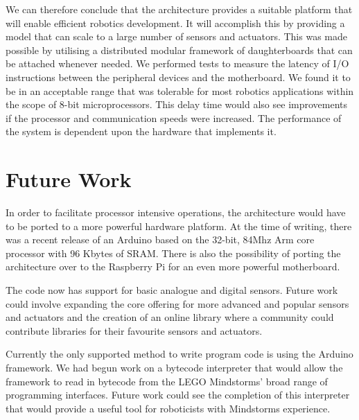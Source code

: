 We can therefore conclude that the \xten architecture provides a suitable platform that will enable efficient robotics development. It will accomplish this by providing a model that can scale to a large number of sensors and actuators. This was made possible by utilising a distributed modular framework of daughterboards that can be attached whenever needed. We performed tests to measure the latency of I/O instructions between the peripheral devices and the motherboard. We found it to be in an acceptable range that was tolerable for most robotics applications within the scope of 8-bit microprocessors. This delay time would also see improvements if the processor and communication speeds were increased. The performance of the system is dependent upon the hardware that implements it.

\section{Future Work}
In order to facilitate processor intensive operations, the architecture would have to be ported to a more powerful hardware platform. At the time of writing, there was a recent release of an Arduino based on the 32-bit, 84Mhz Arm core processor with 96 Kbytes of SRAM. There is also the possibility of porting the architecture over to the Raspberry Pi for an even more powerful motherboard.

The code now has support for basic analogue and digital sensors. Future work could involve expanding the core offering for more advanced and popular sensors and actuators and the creation of an online library where a community could contribute libraries for their favourite sensors and actuators.

Currently the only supported method to write program code is using the Arduino framework. We had begun work on a bytecode interpreter that would allow the \xten framework to read in bytecode from the LEGO Mindstorms' broad range of programming interfaces. Future work could see the completion of this interpreter that would provide a useful tool for roboticists with Mindstorms experience.